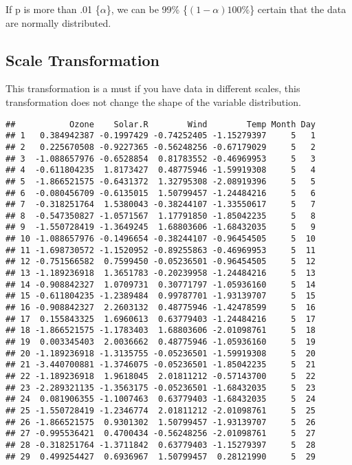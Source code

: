\documentclass[12pt,]{article}
\begin{document}
If p is more than .01 \{\(\alpha\)\}, we can be 99\%
\{\((1-\alpha)100\%\)\} certain that the data are normally distributed.

\subsection{\texorpdfstring{\textbf{Scale
Transformation}}{Scale Transformation}}\label{scale-transformation}

This transformation is a must if you have data in different scales, this
transformation does not change the shape of the variable distribution.

\begin{verbatim}
##           Ozone    Solar.R        Wind        Temp Month Day
## 1   0.384942387 -0.1997429 -0.74252405 -1.15279397     5   1
## 2   0.225670508 -0.9227365 -0.56248256 -0.67179029     5   2
## 3  -1.088657976 -0.6528854  0.81783552 -0.46969953     5   3
## 4  -0.611804235  1.8173427  0.48775946 -1.59919308     5   4
## 5  -1.866521575 -0.6431372  1.32795308 -2.08919396     5   5
## 6  -0.080456709 -0.6135015  1.50799457 -1.24484216     5   6
## 7  -0.318251764  1.5380043 -0.38244107 -1.33550617     5   7
## 8  -0.547350827 -1.0571567  1.17791850 -1.85042235     5   8
## 9  -1.550728419 -1.3649245  1.68803606 -1.68432035     5   9
## 10 -1.088657976 -0.1496654 -0.38244107 -0.96454505     5  10
## 11 -1.698730572 -1.1520952 -0.89255863 -0.46969953     5  11
## 12 -0.751566582  0.7599450 -0.05236501 -0.96454505     5  12
## 13 -1.189236918  1.3651783 -0.20239958 -1.24484216     5  13
## 14 -0.908842327  1.0709731  0.30771797 -1.05936160     5  14
## 15 -0.611804235 -1.2389484  0.99787701 -1.93139707     5  15
## 16 -0.908842327  2.2603132  0.48775946 -1.42478599     5  16
## 17  0.155843325  1.6960613  0.63779403 -1.24484216     5  17
## 18 -1.866521575 -1.1783403  1.68803606 -2.01098761     5  18
## 19  0.003345403  2.0036662  0.48775946 -1.05936160     5  19
## 20 -1.189236918 -1.3135755 -0.05236501 -1.59919308     5  20
## 21 -3.440700881 -1.3746075 -0.05236501 -1.85042235     5  21
## 22 -1.189236918  1.9618045  2.01811212 -0.57143700     5  22
## 23 -2.289321135 -1.3563175 -0.05236501 -1.68432035     5  23
## 24  0.081906355 -1.1007463  0.63779403 -1.68432035     5  24
## 25 -1.550728419 -1.2346774  2.01811212 -2.01098761     5  25
## 26 -1.866521575  0.9301302  1.50799457 -1.93139707     5  26
## 27 -0.995536421  0.4700434 -0.56248256 -2.01098761     5  27
## 28 -0.318251764 -1.3711842  0.63779403 -1.15279397     5  28
## 29  0.499254427  0.6936967  1.50799457  0.28121990     5  29

\end{verbatim}
\end{document}

